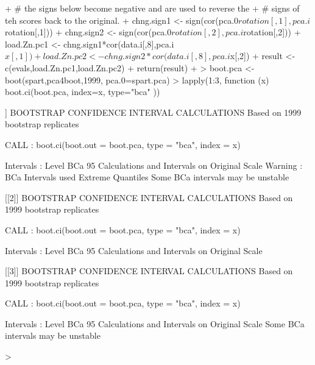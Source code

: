 \documentclass[letterpaper]{article}
\begin{document}
\begin{Schunk}
\begin{Sinput}
{+   # the signs below become negative and are used to reverse the
+   # signs of teh scores back to the original.
+   chng.sign1 <- sign(cor(pca.0$rotation[,1],pca.i$rotation[,1]))
+   chng.sign2 <- sign(cor(pca.0$rotation[,2],pca.i$rotation[,2]))
+   load.Zn.pc1 <- chng.sign1*cor(data.i[,8],pca.i$x[,1])
+   load.Zn.pc2 <- chng.sign2*cor(data.i[,8],pca.i$x[,2])
+   result <- c(evals,load.Zn.pc1,load.Zn.pc2)
+   return(result)
+ }
> boot.pca <- boot(spart,pca4boot,1999, pca.0=spart.pca)
> lapply(1:3, function (x) {boot.ci(boot.pca, index=x, type="bca" )})
\end{Sinput}
\begin{Soutput}
[[1]]
BOOTSTRAP CONFIDENCE INTERVAL CALCULATIONS
Based on 1999 bootstrap replicates

CALL : 
boot.ci(boot.out = boot.pca, type = "bca", index = x)

Intervals : 
Level       BCa          
95%   ( 3.821,  5.441 )  
Calculations and Intervals on Original Scale
Warning : BCa Intervals used Extreme Quantiles
Some BCa intervals may be unstable

[[2]]
BOOTSTRAP CONFIDENCE INTERVAL CALCULATIONS
Based on 1999 bootstrap replicates

CALL : 
boot.ci(boot.out = boot.pca, type = "bca", index = x)

Intervals : 
Level       BCa          
95%   ( 3.071,  4.214 )  
Calculations and Intervals on Original Scale

[[3]]
BOOTSTRAP CONFIDENCE INTERVAL CALCULATIONS
Based on 1999 bootstrap replicates

CALL : 
boot.ci(boot.out = boot.pca, type = "bca", index = x)

Intervals : 
Level       BCa          
95%   ( 1.137,  1.921 )  
Calculations and Intervals on Original Scale
Some BCa intervals may be unstable
\end{Soutput}
\begin{Sinput}
> 
\end{Sinput}
\end{Schunk}
\end{document}
